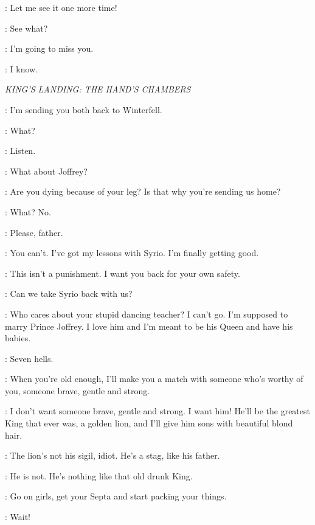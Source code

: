 
\THEON: Let me see it one more time! 

\ROS: See what? 


\THEON: I'm going to miss you. 

\ROS: I know. 


\scene

\textit{KING'S LANDING: THE HAND'S CHAMBERS} 


\NED: I'm sending you both back to Winterfell. 

\SANSA: What? 

\NED: Listen. 

\SANSA: What about Joffrey? 

\ARYA: Are you dying because of your leg? Is that why you're sending us home? 

\NED: What? No. 

\SANSA: Please, father. 

\ARYA: You can't. I've got my lessons with Syrio. I'm finally getting good. 

\NED: This isn't a punishment. I want you back for your own safety. 

\ARYA: Can we take Syrio back with us? 

\SANSA: Who cares about your stupid dancing teacher? I can't go. I'm supposed to marry Prince Joffrey. I love him and I'm meant to be his Queen and have his babies. 

\ARYA: Seven hells. 

\NED: When you're old enough, I'll make you a match with someone who's worthy of you, someone brave, gentle and strong.

\SANSA: I don't want someone brave, gentle and strong. I want him! He'll be the greatest King that ever was, a golden lion, and I'll give him sons with beautiful blond hair. 

\ARYA: The lion's not his sigil, idiot. He's a stag, like his father. 

\SANSA: He is not. He's nothing like that old drunk King. 

\NED:  Go on girls, get your Septa and start packing your things.

\SANSA: Wait! 

